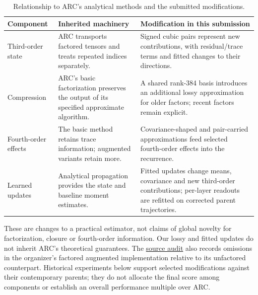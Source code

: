 \documentclass[11pt,letterpaper]{article}
\begin{document}
\begin{table}[htbp]
\centering
\small
\caption{Relationship to ARC's analytical methods and the submitted modifications.}\label{tab:comparison}
\begin{tabular}{@{}>{\raggedright\arraybackslash}p{}>{\raggedright\arraybackslash}p{}>{\raggedright\arraybackslash}p{}@{}}
\toprule
Component & Inherited machinery & Modification in this submission \\
\midrule
Third-order state & ARC transports factored tensors and treats repeated indices separately. & Signed cubic pairs represent new contributions, with residual/trace terms and fitted changes to their directions. \\[3pt]
Compression & ARC's basic factorization preserves the output of its specified approximate algorithm. & A shared rank-384 basis introduces an additional lossy approximation for older factors; recent factors remain explicit. \\[3pt]
Fourth-order effects & The basic method retains trace information; augmented variants retain more. & Covariance-shaped and pair-carried approximations feed selected fourth-order effects into the recurrence. \\[3pt]
Learned updates & Analytical propagation provides the state and baseline moment estimates. & Fitted updates change means, covariance and new third-order contributions; per-layer readouts are refitted on corrected parent trajectories. \\[3pt]
\bottomrule
\end{tabular}
\end{table}

These are changes to a practical estimator, not claims of global novelty for factorization, closure or fourth-order information. Our lossy and fitted updates do not inherit ARC's theoretical guarantees. The \href{https://github.com/mattliston/arc-whitebox-estimation-challenge/blob/main/records/research/2026-09-06-phase-2-public-method-freshness-audit-2026-09-06/PUBLIC_METHOD_AUDIT_2026_09_06_1514_PDT.md}{source audit} also records omissions in the organizer's factored augmented implementation relative to its unfactored counterpart. Historical experiments below support selected modifications against their contemporary parents; they do not allocate the final score among components or establish an overall performance multiple over ARC.
\end{document}
